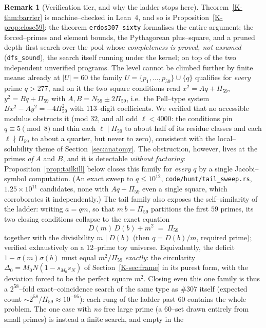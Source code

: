 \documentclass[11pt]{article}
\theoremstyle{definition}
\newtheorem{remark}[theorem]{Remark}
\begin{document}
\begin{remark}[Verification tier, and why the ladder stops here]\label{rem:tier60}
Theorem~\ref{K-thm:barrier} is machine--checked in Lean~4, and so is
Proposition~\ref{K-prop:close59}: the theorem \texttt{erdos307\_sixty} formalises the entire
argument; the forced--primes and element bounds, the Pythagorean plus--square, and a pruned
depth--first search over the pool whose \emph{completeness is proved, not assumed}
(\texttt{dfs\_sound}), the search itself running under the kernel; on top of the
two independent unverified programs. The level cannot be climbed further by finite means: already at $|U|=60$ the family
$U=\{p_1,\dots,p_{59}\}\cup\{q\}$ qualifies for \emph{every} prime $q>277$, and on it the two square
conditions read $x^2=Aq+\Pi_{59}$, $y^2=Bq+\Pi_{59}$ with $A,B=N_{59}\pm2\Pi_{59}$, i.e.\ the
Pell--type system $Bx^2-Ay^2=-4\Pi_{59}^2$ with $113$--digit coefficients. We verified that no
accessible modulus obstructs it (mod $32$, and all odd $\ell<4000$: the conditions pin
$q\equiv5\pmod 8$ and thin each $\ell\mid\Pi_{59}$ to about half of its residue classes and each
$\ell\nmid\Pi_{59}$ to about a quarter, but never to zero), consistent with the local--solubility
theme of Section~\ref{sec:anatomy}. The obstruction, however, lives at the primes \emph{of} $A$
and $B$, and it is detectable \emph{without factoring}: Proposition~\ref{prop:tailkill} below
closes this family for \emph{every} $q$ by a single Jacobi--symbol computation. (An exact sweep to
$q\le10^{12}$, \texttt{code/hunt/tail\_sweep.rs}, $1.25\times10^{11}$ candidates, none with
$Aq+\Pi_{59}$ even a single square, which corroborates it independently.) The tail family also exposes the self--similarity of the ladder:
writing $a=qm$, so that $m\,b=\Pi_{59}$ partitions the first $59$ primes, its two closing
conditions collapse to the exact equation
\[ D(m)\,D(b)+m^2\;=\;\Pi_{59} \]
together with the divisibility $m\mid D(b)$ (then $q=D(b)/m$, required prime); verified
exhaustively on a $12$--prime toy universe. Equivalently, the deficit $1-\sigma(m)\sigma(b)$ must
equal $m^2/\Pi_{59}$ \emph{exactly}: the circularity $\Delta_0=M_0N(1-s_{M_0}s_N)$ of
Section~\ref{K-sec:frame} in its purest form, with the deviation forced to be the perfect square
$m^2$. Closing even this one family is thus a $2^{58}$--fold exact--coincidence search of the same
type as \#307 itself (expected count ${\sim}2^{58}/\Pi_{59}\approx10^{-95}$): each rung of the
ladder past $60$ contains the whole problem. The one case with \emph{no} free large prime (a
$60$--set drawn entirely from small primes) is instead a finite search, and empty in the

\end{remark}
\end{document}
